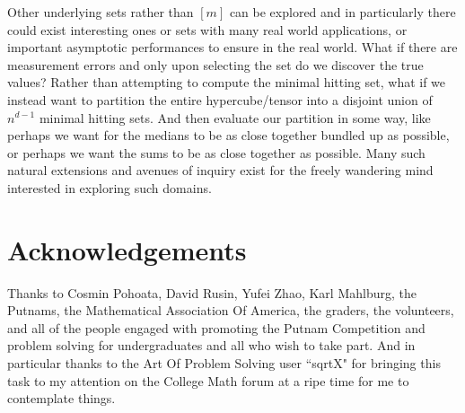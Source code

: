 \documentclass[12pt]{article}
\begin{document}
Other underlying sets rather than $[m]$ can be explored and in particularly there could exist interesting ones or sets with many real world applications, or important asymptotic performances to ensure in the real world. What if there are measurement errors and only upon selecting the set do we discover the true values? Rather than attempting to compute the minimal hitting set, what if we instead want to partition the entire hypercube/tensor into a disjoint union of $n^{d-1}$ minimal hitting sets. And then evaluate our partition in some way, like perhaps we want for the medians to be as close together bundled up as possible, or perhaps we want the sums to be as close together as possible. Many such natural extensions and avenues of inquiry exist for the freely wandering mind interested in exploring such domains.

\section{Acknowledgements}

Thanks to Cosmin Pohoata, David Rusin, Yufei Zhao, Karl Mahlburg, the Putnams, the Mathematical Association Of America, the graders, the volunteers, and all of the people engaged with promoting the Putnam Competition and problem solving for undergraduates and all who wish to take part. And in particular thanks to the Art Of Problem Solving user ``sqrtX" for bringing this task to my attention on the College Math forum at a ripe time for me to contemplate things.

\end{document}
